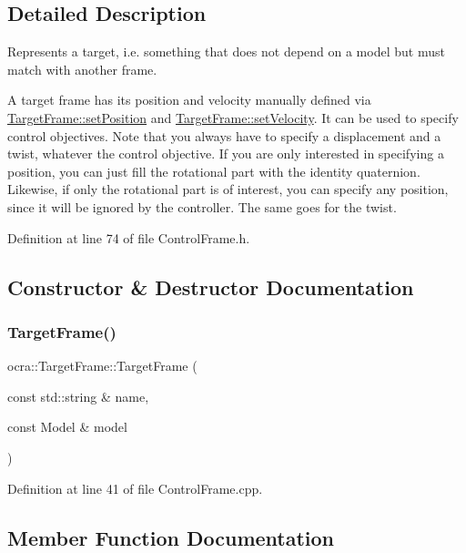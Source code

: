 \subsection{Detailed Description}
Represents a \textquotesingle{}target\textquotesingle{}, i.\+e. something that does not depend on a model but must match with another frame. 

A target frame has its position and velocity manually defined via \hyperlink{classocra_1_1TargetFrame_a760081f3ae88a43ff91dc6a746083286}{Target\+Frame\+::set\+Position} and \hyperlink{classocra_1_1TargetFrame_aff778ddb4526e90b927ec12bda52e8d6}{Target\+Frame\+::set\+Velocity}. It can be used to specify control objectives. Note that you always have to specify a displacement and a twist, whatever the control objective. If you are only interested in specifying a position, you can just fill the rotational part with the identity quaternion. Likewise, if only the rotational part is of interest, you can specify any position, since it will be ignored by the controller. The same goes for the twist. 

Definition at line 74 of file Control\+Frame.\+h.



\subsection{Constructor \& Destructor Documentation}
\hypertarget{classocra_1_1TargetFrame_ab7cf677c24a55434c4b285127235ae3c}{}\label{classocra_1_1TargetFrame_ab7cf677c24a55434c4b285127235ae3c} 
\subsubsection{\texorpdfstring{Target\+Frame()}{TargetFrame()}}
{\footnotesize\ttfamily ocra\+::\+Target\+Frame\+::\+Target\+Frame (\begin{DoxyParamCaption}\item[{const std\+::string \&}]{name,  }\item[{const Model \&}]{model }\end{DoxyParamCaption})}



Definition at line 41 of file Control\+Frame.\+cpp.



\subsection{Member Function Documentation}
\hypertarget{classocra_1_1TargetFrame_ab4512f64463c359090ffdbead9a9e349}{}\label{classocra_1_1TargetFrame_ab4512f64463c359090ffdbead9a9e349} 
